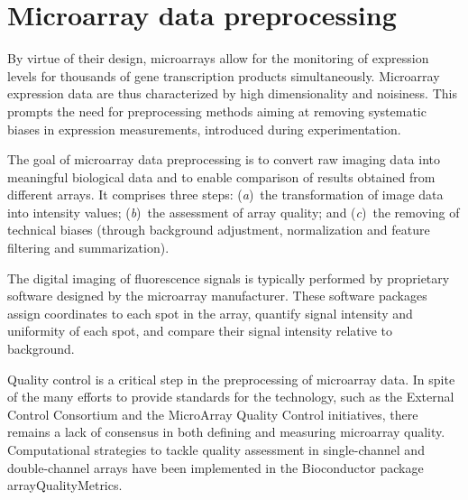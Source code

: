 \section{Microarray data preprocessing}
\label{sec:microarray-methods-data-preprocessing}

By virtue of their design, microarrays allow for the monitoring of expression
levels for thousands of gene transcription products simultaneously.  Microarray
expression data are thus characterized by high dimensionality and noisiness.
This prompts the need for preprocessing methods aiming at removing systematic
biases in expression measurements, introduced during
experimentation.\cite{shakya_comparison_2010}

The goal of microarray data preprocessing is to convert raw imaging data into
meaningful biological data and to enable comparison of results obtained from
different arrays.  It comprises three steps: (\emph{a})~the transformation of
image data into intensity values; (\emph{b})~the assessment of array quality;
and (\emph{c})~the removing of technical biases (through background adjustment,
normalization and feature filtering and summarization).

The digital imaging of fluorescence signals is typically performed by
proprietary software designed by the microarray manufacturer.  These software
packages assign coordinates to each spot in the array, quantify signal intensity
and uniformity of each spot, and compare their signal intensity relative to
background.

Quality control is a critical step in the preprocessing of microarray data.  In
spite of the many efforts to provide standards for the technology, such as the
External  Control Consortium\cite{baker_external_2005} and the
MicroArray Quality Control\cite{consortium_microarray_2010} initiatives, there
remains a lack of consensus in both defining and measuring microarray
quality.\cite{mccall_assessing_2011} Computational strategies to tackle quality
assessment in single-channel and double-channel arrays have been implemented in
the \textsf{Bioconductor} package
\textsf{arrayQualityMetrics}.\cite{kauffmann_arrayqualitymetrics--bioconductor_2009,kauffmann_microarray_2010}



